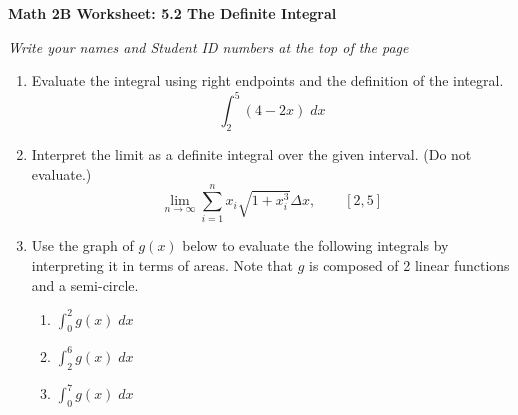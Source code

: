 \documentclass[12pt,fleqn]{article}
\begin{document}
\begin{center}
	\textbf{Math 2B Worksheet: 5.2 The Definite Integral}
\end{center}

\emph{Write your names and Student ID numbers at the top of the page}


\begin{enumerate}
\item Evaluate the integral using right endpoints and the definition of the integral.
\[\int_2^5(4-2x)\;dx\]

\vspace{3in}

\item Interpret the limit as a definite integral over the given interval. (Do not evaluate.)
\[\displaystyle\lim_{n\to\infty}\sum_{i=1}^nx_i\sqrt{1+x_i^3}\Delta x,\qquad [2,5]\]


\newpage

\item Use the graph of $g(x)$ below to evaluate the following integrals by interpreting it in terms of areas.  Note that $g$ is composed of 2 linear functions and a semi-circle.

\begin{enumerate}
  \item $\displaystyle \int_0^2g(x)\;dx$\\[100pt]
  \item $\displaystyle \int_2^6g(x)\;dx$\\[100pt]
  \item $\displaystyle \int_0^7g(x)\;dx$
  \end{enumerate}
  
\end{enumerate}
\end{document}
